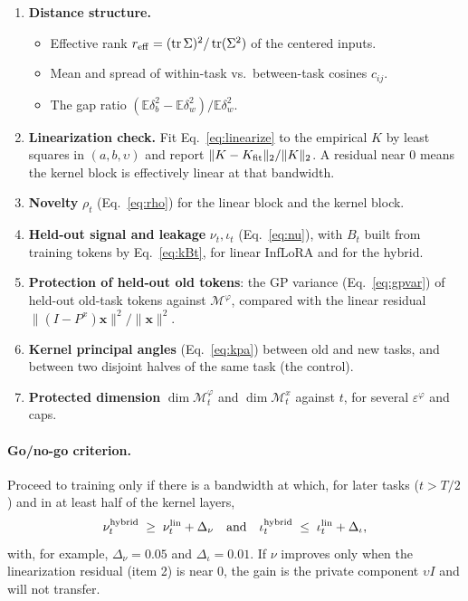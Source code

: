 \documentclass[11pt]{article}
\theoremstyle{plain}
\theoremstyle{definition}
\theoremstyle{remark}
\newcommand{\E}{\mathbb{E}}
\newcommand{\M}{\mathcal{M}}
\newcommand{\tr}{\operatorname{tr}}
\newcommand{\x}{\bm{x}}
\begin{document}
\begin{enumerate}[nosep]
\item \textbf{Distance structure.}
\begin{itemize}[nosep]
\item Effective rank $r_{\rm eff}=(\tr\Sigma)^2/\tr(\Sigma^2)$ of the centered inputs.
\item Mean and spread of within-task vs.\ between-task cosines $c_{ij}$.
\item The gap ratio $(\E\delta_b^2-\E\delta_w^2)/\E\delta_w^2$.
\end{itemize}
\item \textbf{Linearization check.} Fit Eq.~\eqref{eq:linearize} to the empirical $K$ by least squares in $(a,b,\upsilon)$ and report $\|K-K_{\rm fit}\|_2/\|K\|_2$. A residual near $0$ means the kernel block is effectively linear at that bandwidth.
\item \textbf{Novelty} $\rho_t$ (Eq.~\eqref{eq:rho}) for the linear block and the kernel block.
\item \textbf{Held-out signal and leakage} $\nu_t,\iota_t$ (Eq.~\eqref{eq:nu}), with $B_t$ built from training tokens by Eq.~\eqref{eq:kBt}, for linear InfLoRA and for the hybrid.
\item \textbf{Protection of held-out old tokens}: the GP variance (Eq.~\eqref{eq:gpvar}) of held-out old-task tokens against $\M^\varphi$, compared with the linear residual $\|(I-P^x)\x\|^2/\|\x\|^2$.
\item \textbf{Kernel principal angles} (Eq.~\eqref{eq:kpa}) between old and new tasks, and between two disjoint halves of the same task (the control).
\item \textbf{Protected dimension} $\dim\M^\varphi_t$ and $\dim\M^x_t$ against $t$, for several $\varepsilon^\varphi$ and caps.
\end{enumerate}

\paragraph{Go/no-go criterion.} Proceed to training only if there is a bandwidth at which, for later tasks ($t>T/2$) and in at least half of the kernel layers,
\[
\nu^{\rm hybrid}_t \;\ge\; \nu^{\rm lin}_t+\Delta_\nu
\quad\text{and}\quad
\iota^{\rm hybrid}_t\;\le\;\iota^{\rm lin}_t+\Delta_\iota ,
\]
with, for example, $\Delta_\nu=0.05$ and $\Delta_\iota=0.01$. If $\nu$ improves only when the linearization residual (item 2) is near $0$, the gain is the private component $\upsilon I$ and will not transfer.
\end{document}
